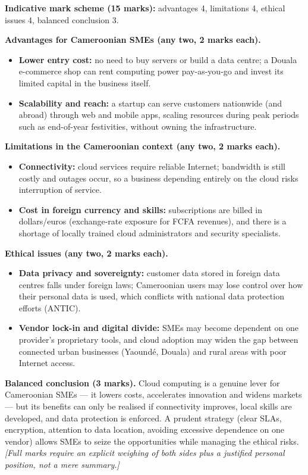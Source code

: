 \documentclass[11pt]{article}
\begin{document}
\begin{corrige}
\textbf{Indicative mark scheme (15 marks):} advantages 4, limitations 4, ethical issues 4, balanced conclusion 3.

\textbf{Advantages for Cameroonian SMEs (any two, 2 marks each).}
\begin{itemize}
\item \textbf{Lower entry cost:} no need to buy servers or build a data centre; a Douala e-commerce shop can rent computing power pay-as-you-go and invest its limited capital in the business itself.
\item \textbf{Scalability and reach:} a startup can serve customers nationwide (and abroad) through web and mobile apps, scaling resources during peak periods such as end-of-year festivities, without owning the infrastructure.
\end{itemize}

\textbf{Limitations in the Cameroonian context (any two, 2 marks each).}
\begin{itemize}
\item \textbf{Connectivity:} cloud services require reliable Internet; bandwidth is still costly and outages occur, so a business depending entirely on the cloud risks interruption of service.
\item \textbf{Cost in foreign currency and skills:} subscriptions are billed in dollars/euros (exchange-rate exposure for FCFA revenues), and there is a shortage of locally trained cloud administrators and security specialists.
\end{itemize}

\textbf{Ethical issues (any two, 2 marks each).}
\begin{itemize}
\item \textbf{Data privacy and sovereignty:} customer data stored in foreign data centres falls under foreign laws; Cameroonian users may lose control over how their personal data is used, which conflicts with national data protection efforts (ANTIC).
\item \textbf{Vendor lock-in and digital divide:} SMEs may become dependent on one provider's proprietary tools, and cloud adoption may widen the gap between connected urban businesses (Yaoundé, Douala) and rural areas with poor Internet access.
\end{itemize}

\textbf{Balanced conclusion (3 marks).} Cloud computing is a genuine lever for Cameroonian SMEs — it lowers costs, accelerates innovation and widens markets — but its benefits can only be realised if connectivity improves, local skills are developed, and data protection is enforced. A prudent strategy (clear SLAs, encryption, attention to data location, avoiding excessive dependence on one vendor) allows SMEs to seize the opportunities while managing the ethical risks. \emph{[Full marks require an explicit weighing of both sides plus a justified personal position, not a mere summary.]}
\end{corrige}
\end{document}
